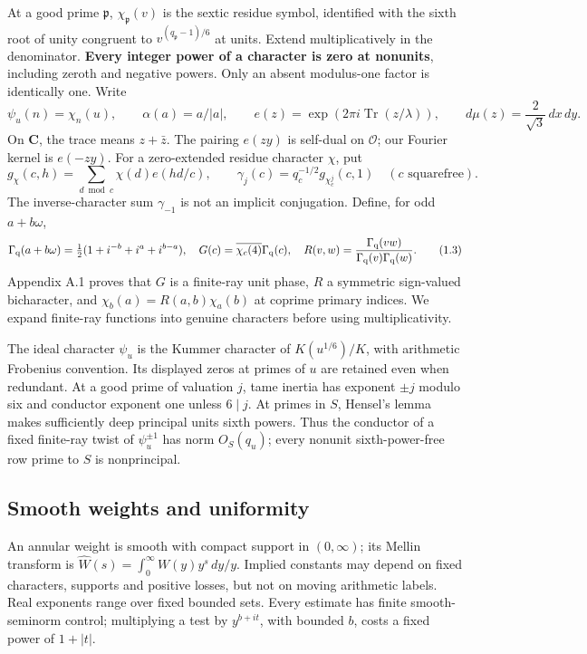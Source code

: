 \documentclass[11pt,a4paper]{article}
\begin{document}
At a good prime \(\mathfrak p\), \(\chi_{\mathfrak p}(v)\) is the sextic residue symbol, identified with the sixth root of unity congruent to \(v^{(q_{\mathfrak p}-1)/6}\) at units. Extend multiplicatively in the denominator. \textbf{Every integer power of a character is zero at nonunits}, including zeroth and negative powers. Only an absent modulus-one factor is identically one. Write \[
\psi_u(n)=\chi_n(u),\qquad \alpha(a)=a/|a|,\qquad
 e(z)=\exp\!\left(2\pi i\operatorname{Tr}(z/\lambda)\right),\qquad
 d\mu(z)=\frac2{\sqrt3}\,dx\,dy.
\tag{1.1}\label{eq:1.1}
\] On \(\mathbf C\), the trace means \(z+\bar z\). The pairing \(e(zy)\) is self-dual on \(\mathcal O\); our Fourier kernel is \(e(-zy)\). For a zero-extended residue character \(\chi\), put \[
 g_\chi(c,h)=\sum_{d\bmod c}\chi(d)e(hd/c),\qquad
 \gamma_j(c)=q_c^{-1/2}g_{\chi_c^j}(c,1)\quad(c\text{ squarefree}).
\tag{1.2}\label{eq:1.2}
\] The inverse-character sum \(\gamma_{-1}\) is not an implicit conjugation. Define, for odd \(a+b\omega\), \[
 \Gamma_{\rm q}(a+b\omega)=\tfrac12(1+i^{-b}+i^a+i^{b-a}),\quad
 G(c)=\overline{\chi_c(4)}\Gamma_{\rm q}(c),\quad
 R(v,w)=\frac{\Gamma_{\rm q}(vw)}{\Gamma_{\rm q}(v)\Gamma_{\rm q}(w)}.
\tag{1.3}\label{eq:1.3}
\] Appendix A.1 proves that \(G\) is a finite-ray unit phase, \(R\) a symmetric sign-valued bicharacter, and \(\chi_b(a)=R(a,b)\chi_a(b)\) at coprime primary indices. We expand finite-ray functions into genuine characters before using multiplicativity.

The ideal character \(\psi_u\) is the Kummer character of \(K(u^{1/6})/K\), with arithmetic Frobenius convention. Its displayed zeros at primes of \(u\) are retained even when redundant. At a good prime of valuation \(j\), tame inertia has exponent \(\pm j\) modulo six and conductor exponent one unless \(6\mid j\). At primes in \(S\), Hensel's lemma makes sufficiently deep principal units sixth powers. Thus the conductor of a fixed finite-ray twist of \(\psi_u^{\pm1}\) has norm \(O_S(q_u)\); every nonunit sixth-power-free row prime to \(S\) is nonprincipal.

\subsection{Smooth weights and uniformity}\label{sec:1.2}

An annular weight is smooth with compact support in \((0,\infty)\); its Mellin transform is \(\widehat W(s)=\int_0^\infty W(y)y^s\,dy/y\). Implied constants may depend on fixed characters, supports and positive losses, but not on moving arithmetic labels. Real exponents range over fixed bounded sets. Every estimate has finite smooth-seminorm control; multiplying a test by \(y^{b+it}\), with bounded \(b\), costs a fixed power of \(1+|t|\).
\end{document}
